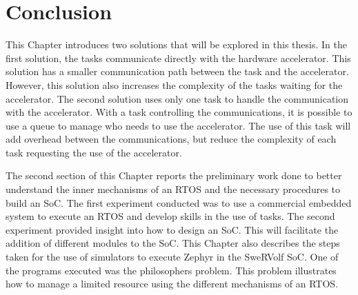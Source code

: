 
\section{Conclusion}
This Chapter introduces two solutions that will be explored in this thesis. In the first solution, the tasks communicate directly with the hardware accelerator. This solution has a smaller communication path between the task and the accelerator. However, this solution also increases the complexity of the tasks waiting for the accelerator. The second solution uses only one task to handle the communication with the accelerator. With a task controlling the communications, it is possible to use a queue to manage who needs to use the accelerator. The use of this task will add overhead between the communications, but reduce the complexity of each task requesting the use of the accelerator.

The second section of this Chapter reports the preliminary work done to better understand the inner mechanisms of an RTOS and the necessary procedures to build an SoC. The first experiment conducted was to use a commercial embedded system to execute an RTOS and develop skills in the use of tasks. The second experiment provided insight into how to design an SoC. This will facilitate the addition of different modules to the SoC. This Chapter also describes the steps taken for the use of simulators to execute Zephyr in the SweRVolf SoC. One of the programs executed was the philosophers problem. This problem illustrates how to manage a limited resource using the different mechanisms of an RTOS.



